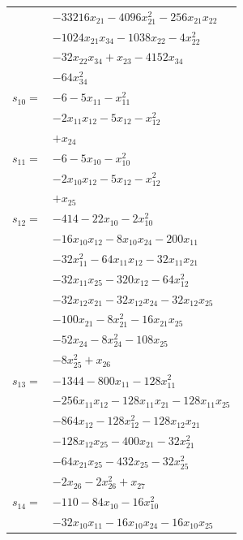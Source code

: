 \begin{longtable}{@{}r@{\;}l@{}}
 & \(\displaystyle -33216x_{21} -4096x_{21}^{2} -256x_{21}x_{22}\) \\
 & \(\displaystyle -1024x_{21}x_{34} -1038x_{22} -4x_{22}^{2}\) \\
 & \(\displaystyle -32x_{22}x_{34} +x_{23} -4152x_{34}\) \\
 & \(\displaystyle -64x_{34}^{2}\) \\[3pt]
\(s_{10}=\) & \(\displaystyle -6 -5x_{11} -x_{11}^{2}\) \\
 & \(\displaystyle -2x_{11}x_{12} -5x_{12} -x_{12}^{2}\) \\
 & \(\displaystyle +x_{24}\) \\[3pt]
\(s_{11}=\) & \(\displaystyle -6 -5x_{10} -x_{10}^{2}\) \\
 & \(\displaystyle -2x_{10}x_{12} -5x_{12} -x_{12}^{2}\) \\
 & \(\displaystyle +x_{25}\) \\[3pt]
\(s_{12}=\) & \(\displaystyle -414 -22x_{10} -2x_{10}^{2}\) \\
 & \(\displaystyle -16x_{10}x_{12} -8x_{10}x_{24} -200x_{11}\) \\
 & \(\displaystyle -32x_{11}^{2} -64x_{11}x_{12} -32x_{11}x_{21}\) \\
 & \(\displaystyle -32x_{11}x_{25} -320x_{12} -64x_{12}^{2}\) \\
 & \(\displaystyle -32x_{12}x_{21} -32x_{12}x_{24} -32x_{12}x_{25}\) \\
 & \(\displaystyle -100x_{21} -8x_{21}^{2} -16x_{21}x_{25}\) \\
 & \(\displaystyle -52x_{24} -8x_{24}^{2} -108x_{25}\) \\
 & \(\displaystyle -8x_{25}^{2} +x_{26}\) \\[3pt]
\(s_{13}=\) & \(\displaystyle -1344 -800x_{11} -128x_{11}^{2}\) \\
 & \(\displaystyle -256x_{11}x_{12} -128x_{11}x_{21} -128x_{11}x_{25}\) \\
 & \(\displaystyle -864x_{12} -128x_{12}^{2} -128x_{12}x_{21}\) \\
 & \(\displaystyle -128x_{12}x_{25} -400x_{21} -32x_{21}^{2}\) \\
 & \(\displaystyle -64x_{21}x_{25} -432x_{25} -32x_{25}^{2}\) \\
 & \(\displaystyle -2x_{26} -2x_{26}^{2} +x_{27}\) \\[3pt]
\(s_{14}=\) & \(\displaystyle -110 -84x_{10} -16x_{10}^{2}\) \\
 & \(\displaystyle -32x_{10}x_{11} -16x_{10}x_{24} -16x_{10}x_{25}\) \\

\end{longtable}
